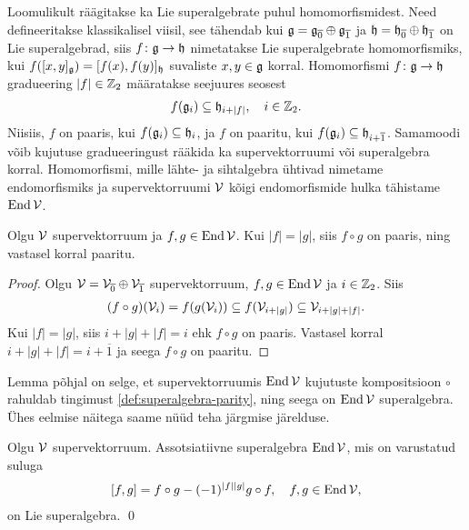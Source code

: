 Loomulikult räägitakse ka Lie superalgebrate puhul homomorfismidest. Need
defineeritakse klassikalisel viisil, see tähendab kui
$\mathfrak{g} = \mathfrak{g}_{\overline{0}} \oplus \mathfrak{g}_{\overline{1}}$ ja
$\mathfrak{h} = \mathfrak{h}_{\overline{0}} \oplus \mathfrak{h}_{\overline{1}}$
on Lie superalgebrad, siis $f \colon \mathfrak{g} \to \mathfrak{h}$ nimetatakse
Lie superalgebrate homomorfismiks, kui
$f([x, y]_{\mathfrak{g}}) = [f(x), f(y)]_{\mathfrak{h}}$
suvaliste $x, y \in \mathfrak{g}$ korral. Homomorfismi $f \colon \mathfrak{g} \to \mathfrak{h}$
gradueering $|f| \in \mathbb{Z}_2$ määratakse seejuures seosest
\begin{align*}
    f(\mathfrak{g}_i) \subseteq \mathfrak{h}_{i + |f|}, \quad i \in \mathbb{Z}_2.
\end{align*}
Niisiis, $f$ on paaris, kui $f(\mathfrak{g}_i) \subseteq \mathfrak{h}_i$, ja $f$ on paaritu,
kui $f(\mathfrak{g}_i) \subseteq \mathfrak{h}_{i+\overline{1}}$. Samamoodi võib kujutuse
gradueeringust rääkida ka supervektorruumi või superalgebra korral.
Homomorfismi, mille lähte- ja sihtalgebra ühtivad nimetame endomorfismiks
ja supervektorruumi $\mathcal{V}$ kõigi endomorfismide hulka tähistame $\operatorname{End} \mathcal{V}$.

\begin{lemma}\label{lemma:kompositsiooni-paarsus}
    Olgu $\mathcal{V}$ supervektorruum ja $f, g \in \operatorname{End} \mathcal{V}$. Kui $|f| = |g|$,
    siis $f \circ g$ on paaris, ning vastasel korral paaritu.
\end{lemma}

\begin{proof}
    Olgu $\mathcal{V} = \mathcal{V}_{\overline{0}} \oplus \mathcal{V}_{\overline{1}}$ supervektorruum,
    $f, g \in \operatorname{End} \mathcal{V}$ ja $i \in \mathbb{Z}_2$. Siis
    \begin{align*}
        (f \circ g)(\mathcal{V}_i) = f(g(\mathcal{V}_i)) \subseteq
        f(\mathcal{V}_{i + |g|}) \subseteq \mathcal{V}_{i + |g| + |f|}.
    \end{align*}
    Kui $|f| = |g|$, siis $i + |g| + |f| = i$ ehk $f \circ g$ on paaris.
    Vastasel korral $i + |g| + |f| = i + \overline{1}$ ja seega
    $f \circ g$ on paaritu.
\end{proof}

Lemma põhjal on selge, et supervektorruumis $\operatorname{End} \mathcal{V}$ kujutuste
kompositsioon $\circ$ rahuldab tingimust \eqref{def:superalgebra-parity},
ning seega on $\operatorname{End} \mathcal{V}$ superalgebra. Ühes eelmise näitega saame nüüd
teha järgmise järelduse.

\begin{jar}
    Olgu $\mathcal{V}$ supervektorruum. Assotsiatiivne superalgebra
    $\operatorname{End} \mathcal{V}$, mis on varustatud suluga
    \begin{align}\label{eq:end_v_sulg}
        [f, g] = f \circ g - (-1)^{|f||g|} g \circ f, \quad f, g \in \operatorname{End} \mathcal{V},
    \end{align}
    on Lie superalgebra. \hfill \qed
\end{jar}

